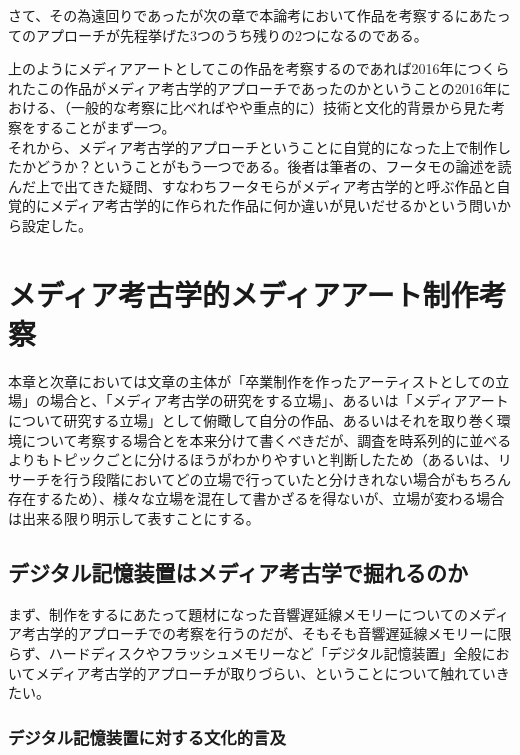 \documentclass[a4paper,report]{jsbook}
\begin{document}
さて、その為遠回りであったが次の章で本論考において作品を考察するにあたってのアプローチが先程挙げた3つのうち残りの2つになるのである。

上のようにメディアアートとしてこの作品を考察するのであれば2016年につくられたこの作品がメディア考古学的アプローチであったのかということの2016年における、（一般的な考察に比べればやや重点的に）技術と文化的背景から見た考察をすることがまず一つ。\\
それから、メディア考古学的アプローチということに自覚的になった上で制作したかどうか？ということがもう一つである。後者は筆者の、フータモの論述を読んだ上で出てきた疑問、すなわちフータモらがメディア考古学的と呼ぶ作品と自覚的にメディア考古学的に作られた作品に何か違いが見いだせるかという問いから設定した。

\chapter{メディア考古学的メディアアート制作考察}\label{ux30e1ux30c7ux30a3ux30a2ux8003ux53e4ux5b66ux7684ux30e1ux30c7ux30a3ux30a2ux30a2ux30fcux30c8ux5236ux4f5cux8003ux5bdf}

本章と次章においては文章の主体が「卒業制作を作ったアーティストとしての立場」の場合と、「メディア考古学の研究をする立場」、あるいは「メディアアートについて研究する立場」として俯瞰して自分の作品、あるいはそれを取り巻く環境について考察する場合とを本来分けて書くべきだが、調査を時系列的に並べるよりもトピックごとに分けるほうがわかりやすいと判断したため（あるいは、リサーチを行う段階においてどの立場で行っていたと分けきれない場合がもちろん存在するため）、様々な立場を混在して書かざるを得ないが、立場が変わる場合は出来る限り明示して表すことにする。

\section{デジタル記憶装置はメディア考古学で掘れるのか}\label{ux30c7ux30b8ux30bfux30ebux8a18ux61b6ux88c5ux7f6eux306fux30e1ux30c7ux30a3ux30a2ux8003ux53e4ux5b66ux3067ux6398ux308cux308bux306eux304b}

まず、制作をするにあたって題材になった音響遅延線メモリーについてのメディア考古学的アプローチでの考察を行うのだが、そもそも音響遅延線メモリーに限らず、ハードディスクやフラッシュメモリーなど「デジタル記憶装置」全般においてメディア考古学的アプローチが取りづらい、ということについて触れていきたい。

\subsection{デジタル記憶装置に対する文化的言及}\label{ux30c7ux30b8ux30bfux30ebux8a18ux61b6ux88c5ux7f6eux306bux5bfeux3059ux308bux6587ux5316ux7684ux8a00ux53ca}
\end{document}
